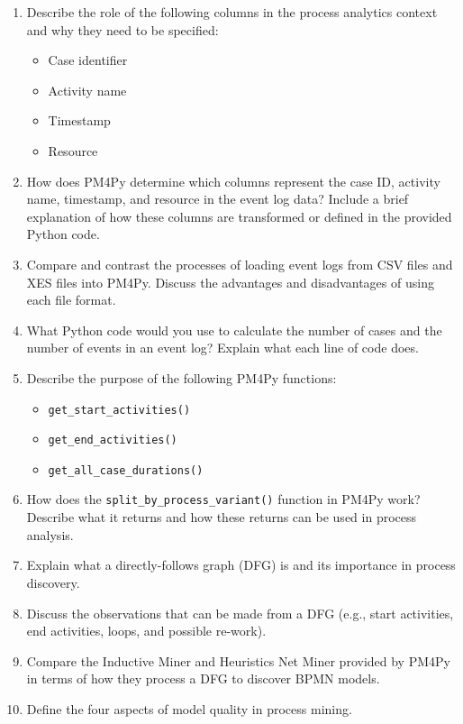 \begin{enumerate}

    \item Describe the role of the following columns in the process analytics context and why they need to be specified:
    \begin{itemize}
        \item Case identifier
        \item Activity name
        \item Timestamp
        \item Resource
    \end{itemize}
    \item How does PM4Py determine which columns represent the case ID, activity name, timestamp, and resource in the event log data? Include a brief explanation of how these columns are transformed or defined in the provided Python code.
    \item Compare and contrast the processes of loading event logs from CSV files and XES files into PM4Py. Discuss the advantages and disadvantages of using each file format.
    \item What Python code would you use to calculate the number of cases and the number of events in an event log? Explain what each line of code does.
    \item Describe the purpose of the following PM4Py functions:
    \begin{itemize}
        \item \texttt{get\_start\_activities()}
        \item \texttt{get\_end\_activities()}
        \item \texttt{get\_all\_case\_durations()}
    \end{itemize}
    \item How does the \texttt{split\_by\_process\_variant()} function in PM4Py work? Describe what it returns and how these returns can be used in process analysis.
    \item Explain what a directly-follows graph (DFG) is and its importance in process discovery.
    \item Discuss the observations that can be made from a DFG (e.g., start activities, end activities, loops, and possible re-work).
    \item Compare the Inductive Miner and Heuristics Net Miner provided by PM4Py in terms of how they process a DFG to discover BPMN models.
    \item Define the four aspects of model quality in process mining.

\end{enumerate}

